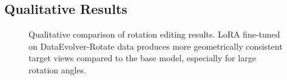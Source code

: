 \subsection{Qualitative Results}
\label{sec:exp:qual}

\begin{figure}[t]
  \centering
  \caption{
    Qualitative comparison of rotation editing results.
    LoRA fine-tuned on DataEvolver-Rotate data produces more geometrically consistent
    target views compared to the base model, especially for large rotation angles.
  }
  \label{fig:qual_lora}
\end{figure}
